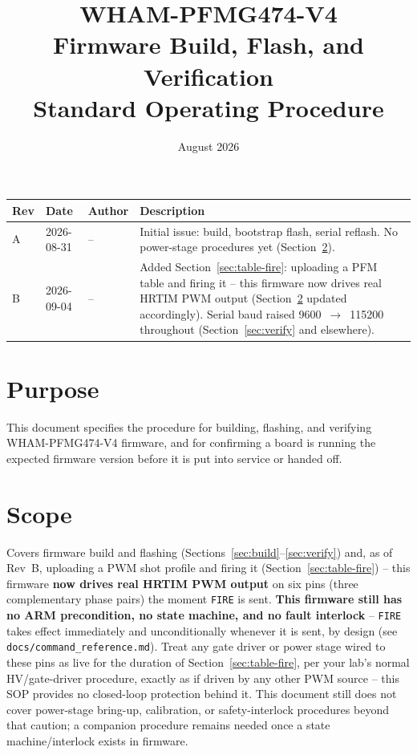 \documentclass[11pt]{article}
\title{WHAM-PFMG474-V4\\ \large Firmware Build, Flash, and Verification \\ Standard Operating Procedure}
\author{}
\date{August 2026}
\newcommand{\code}[1]{\texttt{#1}}
\begin{document}
\maketitle

\begin{center}
\begin{tabular}{p{0.45in} p{0.75in} p{0.5in} p{2.7in}}
  \hline
  \textbf{Rev} & \textbf{Date} & \textbf{Author} & \textbf{Description} \\
  \hline
  A & 2026-08-31 & -- & Initial issue: build, bootstrap flash, serial
    reflash. No power-stage procedures yet (Section~\ref{sec:scope}). \\
  B & 2026-09-04 & -- & Added Section~\ref{sec:table-fire}: uploading a
    PFM table and firing it -- this firmware now drives real HRTIM PWM
    output (Section~\ref{sec:scope} updated accordingly). Serial baud
    raised 9600~$\to$~115200 throughout (Section~\ref{sec:verify} and
    elsewhere). \\
  \hline
\end{tabular}
\end{center}

\section{Purpose}

This document specifies the procedure for building, flashing, and
verifying WHAM-PFMG474-V4 firmware, and for confirming a board is
running the expected firmware version before it is put into service or
handed off.

\section{Scope}
\label{sec:scope}

Covers firmware build and flashing (Sections~\ref{sec:build}--\ref{sec:verify})
and, as of Rev~B, uploading a PWM shot profile and firing it
(Section~\ref{sec:table-fire}) -- this firmware \textbf{now drives real
HRTIM PWM output} on six pins (three complementary phase pairs) the
moment \code{FIRE} is sent. \textbf{This firmware still has no ARM
precondition, no state machine, and no fault interlock} -- \code{FIRE}
takes effect immediately and unconditionally whenever it is sent, by
design (see \code{docs/command\_reference.md}). Treat any gate driver or
power stage wired to these pins as live for the duration of
Section~\ref{sec:table-fire}, per your lab's normal HV/gate-driver
procedure, exactly as if driven by any other PWM source -- this SOP
provides no closed-loop protection behind it. This document still does
not cover power-stage bring-up, calibration, or safety-interlock
procedures beyond that caution; a companion procedure remains needed
once a state machine/interlock exists in firmware.
\end{document}
